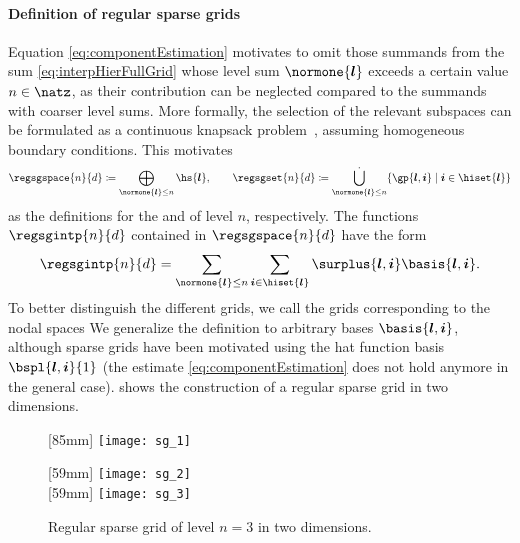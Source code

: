 \paragraph{Definition of regular sparse grids}

Equation \eqref{eq:componentEstimation} motivates to omit those summands
from the sum \eqref{eq:interpHierFullGrid} whose level sum $\normone{\*l}$
exceeds a certain value $n \in \natz$,
as their contribution can be neglected compared to the summands
with coarser level sums.
More formally, the selection of the relevant subspaces can be formulated as a
continuous knapsack problem~\cite{Bungartz04Sparse},
assuming homogeneous boundary conditions.
This motivates
\begin{equation}
  \label{eq:regularSG}
  \regsgspace{n}{d}
  \ceq \bigoplus_{\normone{\*l} \le n} \hs{\*l},\qquad
  \regsgset{n}{d}
  \ceq \bigdotcup_{\normone{\*l} \le n}
  \{\gp{\*l,\*i} \mid \*i \in \hiset{\*l}\}
\end{equation}
as the definitions for the  and
 of level $n$, respectively.
The functions $\regsgintp{n}{d}$ contained in
$\regsgspace{n}{d}$ have the form
\begin{equation}
  \label{eq:regularSGInterpolant}
  \regsgintp{n}{d}
  = \sum_{\normone{\*l} \le n} \sum_{\*i \in \hiset{\*l}}
  \surplus{\*l,\*i} \basis{\*l,\*i}.
\end{equation}
To better distinguish the different grids,
we call the grids corresponding to the nodal spaces 
We generalize the definition to arbitrary bases $\basis{\*l,\*i}$,
although sparse grids have been motivated using the hat function
basis $\bspl{\*l,\*i}{1}$
(the estimate \eqref{eq:componentEstimation} does not hold anymore
in the general case).
 shows the construction of a
regular sparse grid in two dimensions.

\begin{figure}
  [85mm]{%
    \texttt{[image: sg\_1]}%
  }%
  \hfill%
  \begin{minipage}[b]{59mm}
    [59mm]{%
      \texttt{[image: sg\_2]}%
    }\\[4mm]%
    [59mm]{%
      \texttt{[image: sg\_3]}%
    }%
  \end{minipage}%
  \caption[%
    Regular two-dimensional sparse grid%
  ]{%
    Regular sparse grid of level $n = 3$ in two dimensions.%
  }%
  \label{fig:regularSG}%
\end{figure}

